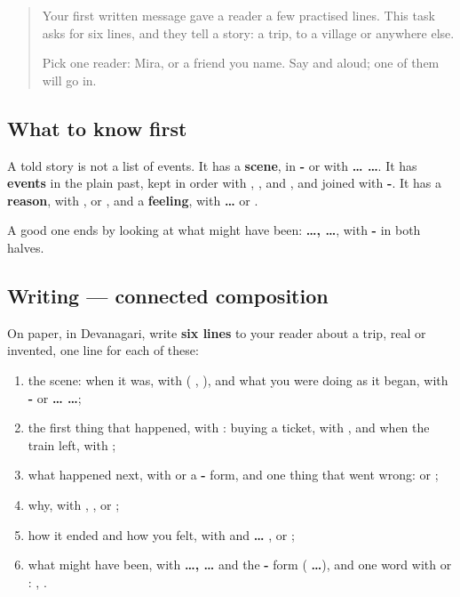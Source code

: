 \begin{quote}
Your first written message gave a reader a few practised lines. This task asks for six lines, and they tell a story: a trip, to a village or anywhere else.

Pick one reader: Mira, or a friend you name. Say \textbf{} and \textbf{} aloud; one of them will go in.
\end{quote}

\subsection*{What to know first}
A told story is not a list of events. It has a \textbf{scene}, in \textbf{- } or with \textbf{ …  …}. It has \textbf{events} in the plain past, kept in order with \textbf{}, \textbf{}, \textbf{ } and \textbf{ }, and joined with \textbf{-}. It has a \textbf{reason}, with \textbf{}, \textbf{} or \textbf{  }, and a \textbf{feeling}, with \textbf{ … } or \textbf{  }.

A good one ends by looking at what might have been: \textbf{ …,  …}, with \textbf{-} in both halves.

\subsection*{Writing — connected composition}
On paper, in Devanagari, write \textbf{six lines} to your reader about a trip, real or invented, one line for each of these:

\begin{enumerate}
\raggedright
  \item the scene: when it was, with \textbf{} (\textbf{ }, \textbf{ }), and what you were doing as it began, with \textbf{- } or \textbf{ …  …};
  \item the first thing that happened, with \textbf{}: buying a ticket, with \textbf{}, and when the train left, with \textbf{};
  \item what happened next, with \textbf{} or a \textbf{-} form, and one thing that went wrong: \textbf{ } or \textbf{ };
  \item why, with \textbf{}, \textbf{}, \textbf{  } or \textbf{   };
  \item how it ended and how you felt, with \textbf{ } and \textbf{ … }, \textbf{  } or \textbf{   };
  \item what might have been, with \textbf{ …,  …} and the \textbf{-} form (\textbf{    …}), and one word with \textbf{} or \textbf{}: \textbf{}, \textbf{}.
\end{enumerate}

